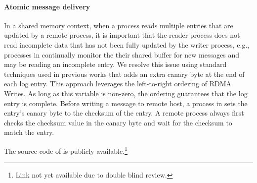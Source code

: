 \paragraph{Atomic message delivery}
In a shared memory context, when a process reads multiple entries that are
updated by a remote process, it is important that the reader process does not
read incomplete data that has not been fully updated by the writer process,
e.g., processes in \libname continually monitor the their shared buffer for new
messages and may be reading an incomplete entry. We resolve this issue using
standard techniques used in previous works \cite{APUS,FaRM,kalia2014using,
islam2012high} that adds an extra canary byte at the end of each log entry. This
approach leverages the left-to-right ordering of RDMA Writes. As long as this
variable is non-zero, the ordering guarantees that the log entry is complete.
Before writing a message to remote host, a process in \libname sets the entry’s
canary byte to the checksum of the entry. A remote process always first checks
the checksum value in the canary byte and wait for the checksum to match the
entry.

The source code of \libname is publicly available.\footnote{Link not yet available due to double blind review.}

%
%

